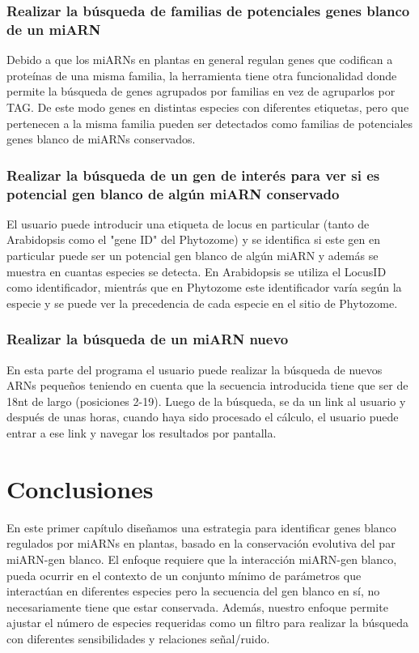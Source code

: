 \subsubsection{Realizar la búsqueda de familias de potenciales genes blanco de un miARN}
Debido a que los miARNs en plantas en general regulan genes que codifican a proteínas de una misma familia, la herramienta tiene otra funcionalidad donde permite la búsqueda de genes agrupados por familias en vez de agruparlos por TAG.
De este modo genes en distintas especies con diferentes etiquetas, pero que pertenecen a la misma familia pueden ser detectados como familias de potenciales genes blanco de miARNs conservados.

\subsubsection{Realizar la búsqueda de un gen de interés para ver si es potencial gen blanco de algún miARN conservado}

El usuario puede introducir una etiqueta de locus en particular (tanto de Arabidopsis como el "gene ID" del Phytozome) y se identifica si este gen en particular puede ser un potencial gen blanco de algún miARN y además se muestra en cuantas especies se detecta.
En Arabidopsis se utiliza el LocusID como identificador, mientrás que en Phytozome este identificador varía según la especie y se puede ver la precedencia de cada especie en el sitio de Phytozome.

\subsubsection{Realizar la búsqueda de un miARN nuevo}
En esta parte del programa el usuario puede realizar la búsqueda de nuevos ARNs pequeños teniendo en cuenta que la secuencia introducida tiene que ser de 18nt de largo (posiciones 2-19).
Luego de la búsqueda, se da un link al usuario y después de unas horas, cuando haya sido procesado el cálculo, el usuario puede entrar a ese link y navegar los resultados por pantalla.


\section{Conclusiones}

En este primer capítulo diseñamos una estrategia para identificar genes blanco regulados por miARNs en plantas, basado en la conservación evolutiva del par miARN-gen blanco.
El enfoque requiere que la interacción miARN-gen blanco, pueda ocurrir en el contexto de un conjunto mínimo de parámetros que interactúan en diferentes especies pero la secuencia del gen blanco en sí, no necesariamente tiene que estar conservada.
Además, nuestro enfoque permite ajustar el número de especies requeridas como un filtro para realizar la búsqueda con diferentes sensibilidades y relaciones señal/ruido.

